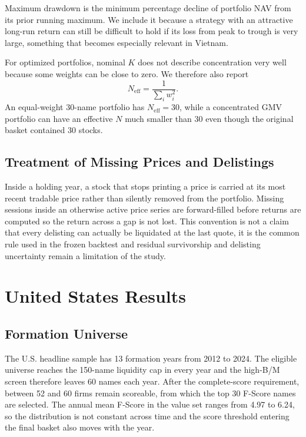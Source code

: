 \documentclass[11pt,a4paper]{report}
\numberwithin{figure}{chapter}
\numberwithin{table}{chapter}
\numberwithin{equation}{chapter}
\begin{document}
Maximum drawdown is the minimum percentage decline of portfolio NAV from its prior running maximum. We include it because a strategy with an attractive long-run return can still be difficult to hold if its loss from peak to trough is very large, something that becomes especially relevant in Vietnam.

For optimized portfolios, nominal $K$ does not describe concentration very well because some weights can be close to zero. We therefore also report
\begin{equation}
N_{\mathrm{eff}} = \frac{1}{\sum_i w_i^2}.
\label{eq:effective_n}
\end{equation}
An equal-weight 30-name portfolio has $N_{\mathrm{eff}}=30$, while a concentrated GMV portfolio can have an effective $N$ much smaller than 30 even though the original basket contained 30 stocks.

\section{Treatment of Missing Prices and Delistings}

Inside a holding year, a stock that stops printing a price is carried at its most recent tradable price rather than silently removed from the portfolio. Missing sessions inside an otherwise active price series are forward-filled before returns are computed so the return across a gap is not lost. This convention is not a claim that every delisting can actually be liquidated at the last quote, it is the common rule used in the frozen backtest and residual survivorship and delisting uncertainty remain a limitation of the study.

\chapter{United States Results}
\label{chap:us}

\section{Formation Universe}

The U.S. headline sample has 13 formation years from 2012 to 2024. The eligible universe reaches the 150-name liquidity cap in every year and the high-B/M screen therefore leaves 60 names each year. After the complete-score requirement, between 52 and 60 firms remain scoreable, from which the top 30 F-Score names are selected. The annual mean F-Score in the value set ranges from 4.97 to 6.24, so the distribution is not constant across time and the score threshold entering the final basket also moves with the year.
\end{document}
